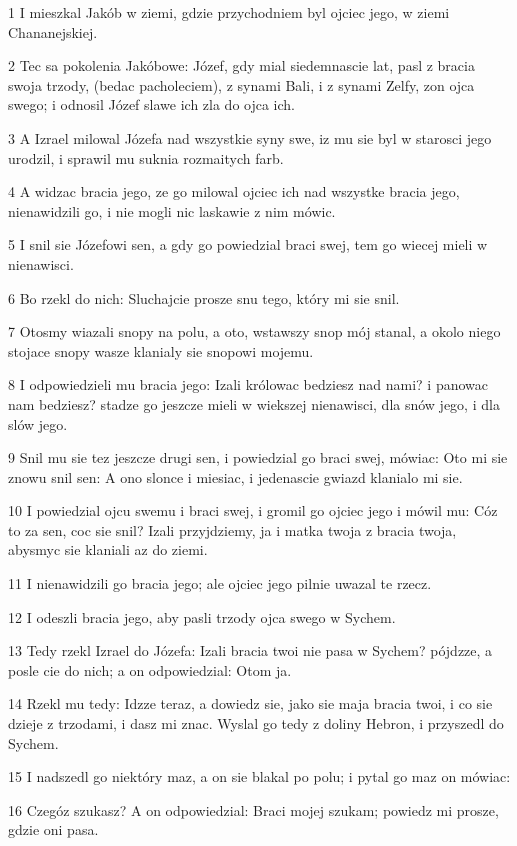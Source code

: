 \par 1 I mieszkal Jakób w ziemi, gdzie przychodniem byl ojciec jego, w ziemi Chananejskiej.
\par 2 Tec sa pokolenia Jakóbowe: Józef, gdy mial siedemnascie lat, pasl z bracia swoja trzody, (bedac pacholeciem), z synami Bali, i z synami Zelfy, zon ojca swego; i odnosil Józef slawe ich zla do ojca ich.
\par 3 A Izrael milowal Józefa nad wszystkie syny swe, iz mu sie byl w starosci jego urodzil, i sprawil mu suknia rozmaitych farb.
\par 4 A widzac bracia jego, ze go milowal ojciec ich nad wszystke bracia jego, nienawidzili go, i nie mogli nic laskawie z nim mówic.
\par 5 I snil sie Józefowi sen, a gdy go powiedzial braci swej, tem go wiecej mieli w nienawisci.
\par 6 Bo rzekl do nich: Sluchajcie prosze snu tego, który mi sie snil.
\par 7 Otosmy wiazali snopy na polu, a oto, wstawszy snop mój stanal, a okolo niego stojace snopy wasze klanialy sie snopowi mojemu.
\par 8 I odpowiedzieli mu bracia jego: Izali królowac bedziesz nad nami? i panowac nam bedziesz? stadze go jeszcze mieli w wiekszej nienawisci, dla snów jego, i dla slów jego.
\par 9 Snil mu sie tez jeszcze drugi sen, i powiedzial go braci swej, mówiac: Oto mi sie znowu snil sen: A ono slonce i miesiac, i jedenascie gwiazd klanialo mi sie.
\par 10 I powiedzial ojcu swemu i braci swej, i gromil go ojciec jego i mówil mu: Cóz to za sen, coc sie snil? Izali przyjdziemy, ja i matka twoja z bracia twoja, abysmyc sie klaniali az do ziemi.
\par 11 I nienawidzili go bracia jego; ale ojciec jego pilnie uwazal te rzecz.
\par 12 I odeszli bracia jego, aby pasli trzody ojca swego w Sychem.
\par 13 Tedy rzekl Izrael do Józefa: Izali bracia twoi nie pasa w Sychem? pójdzze, a posle cie do nich; a on odpowiedzial: Otom ja.
\par 14 Rzekl mu tedy: Idzze teraz, a dowiedz sie, jako sie maja bracia twoi, i co sie dzieje z trzodami, i dasz mi znac. Wyslal go tedy z doliny Hebron, i przyszedl do Sychem.
\par 15 I nadszedl go niektóry maz, a on sie blakal po polu; i pytal go maz on mówiac:
\par 16 Czegóz szukasz? A on odpowiedzial: Braci mojej szukam; powiedz mi prosze, gdzie oni pasa.
